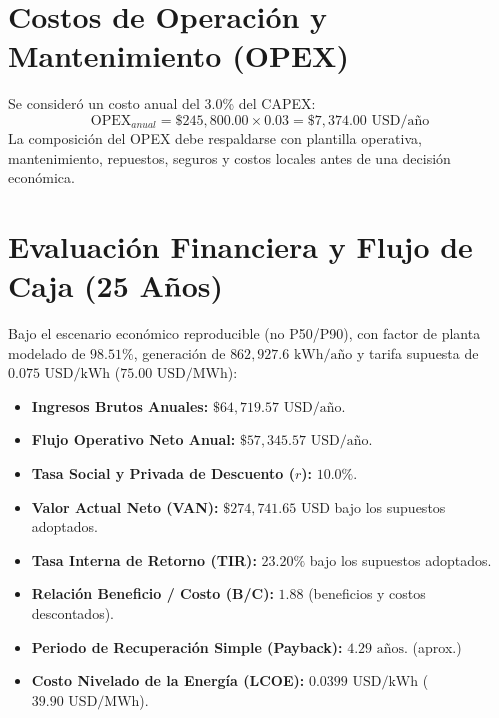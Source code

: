 \documentclass[11pt,a4paper]{report}
\begin{document}
\section{Costos de Operación y Mantenimiento (OPEX)}
Se consideró un costo anual del 3.0\% del CAPEX:
\begin{equation}
\text{OPEX}_{anual} = \$ 245,800.00 \times 0.03 = \$ 7,374.00\text{ USD/año}
\end{equation}
La composición del OPEX debe respaldarse con plantilla operativa, mantenimiento, repuestos, seguros y costos locales antes de una decisión económica.

\section{Evaluación Financiera y Flujo de Caja (25 Años)}
Bajo el escenario económico reproducible (no P50/P90), con factor de planta modelado de $98.51\%$, generación de $862,927.6\text{ kWh/año}$ y tarifa supuesta de $0.075\text{ USD/kWh}$ ($75.00\text{ USD/MWh}$):
\begin{itemize}
    \item \textbf{Ingresos Brutos Anuales:} $\$ 64,719.57\text{ USD/año}$.
    \item \textbf{Flujo Operativo Neto Anual:} $\$ 57,345.57\text{ USD/año}$.
    \item \textbf{Tasa Social y Privada de Descuento ($r$):} $10.0\%$.
    \item \textbf{Valor Actual Neto (VAN):} $\$ 274,741.65\text{ USD}$ bajo los supuestos adoptados.
    \item \textbf{Tasa Interna de Retorno (TIR):} $23.20\%$ bajo los supuestos adoptados.
    \item \textbf{Relación Beneficio / Costo (B/C):} $1.88$ (beneficios y costos descontados).
    \item \textbf{Periodo de Recuperación Simple (Payback):} $4.29\text{ años}$. (aprox.)
    \item \textbf{Costo Nivelado de la Energía (LCOE):} $0.0399\text{ USD/kWh}$ ($39.90\text{ USD/MWh}$).
\end{itemize}
\end{document}
